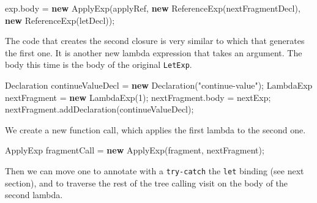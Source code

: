 \documentclass[12pt,a4paper,oneside,openright]{book}
\newenvironment{Shaded}{\begin{snugshade}}{\end{snugshade}}
\newcommand{\KeywordTok}[1]{\textcolor[rgb]{0.13,0.29,0.53}{\textbf{{#1}}}}
\newcommand{\DecValTok}[1]{\textcolor[rgb]{0.00,0.00,0.81}{{#1}}}
\newcommand{\StringTok}[1]{\textcolor[rgb]{0.31,0.60,0.02}{{#1}}}
\newcommand{\CommentTok}[1]{\textcolor[rgb]{0.56,0.35,0.01}{\textit{{#1}}}}
\newcommand{\FunctionTok}[1]{\textcolor[rgb]{0.00,0.00,0.00}{{#1}}}
\newcommand{\NormalTok}[1]{{#1}}
\begin{document}
\begin{Shaded}
\begin{Highlighting}[]
\NormalTok{exp.}\FunctionTok{body} \NormalTok{= }\KeywordTok{new} \FunctionTok{ApplyExp}\NormalTok{(applyRef,}
                        \KeywordTok{new} \FunctionTok{ReferenceExp}\NormalTok{(nextFragmentDecl),}
                        \KeywordTok{new} \FunctionTok{ReferenceExp}\NormalTok{(letDecl));}
\end{Highlighting}
\end{Shaded}

The code that creates the second closure is very similar to which that
generates the first one. It is another new lambda expression that takes
an argument. The body this time is the body of the original
\texttt{LetExp}.

\begin{Shaded}
\begin{Highlighting}[]
\NormalTok{Declaration continueValueDecl = }\KeywordTok{new} \FunctionTok{Declaration}\NormalTok{(}\StringTok{"continue-value"}\NormalTok{);}
\NormalTok{LambdaExp nextFragment = }\KeywordTok{new} \FunctionTok{LambdaExp}\NormalTok{(}\DecValTok{1}\NormalTok{);}
\NormalTok{nextFragment.}\FunctionTok{body} \NormalTok{= nextExp;}
\NormalTok{nextFragment.}\FunctionTok{addDeclaration}\NormalTok{(continueValueDecl);}
\end{Highlighting}
\end{Shaded}

We create a new function call, which applies the first lambda to the
second one.

\begin{Shaded}
\end{Shaded}

\begin{Shaded}
\begin{Highlighting}[]
\NormalTok{ApplyExp fragmentCall = }\KeywordTok{new} \FunctionTok{ApplyExp}\NormalTok{(fragment,}
                                     \NormalTok{nextFragment);}
\end{Highlighting}
\end{Shaded}

Then we can move one to annotate with a \texttt{try-catch} the
\texttt{let} binding (see next section), and to traverse the rest of the
tree calling visit on the body of the second lambda.
\end{document}
